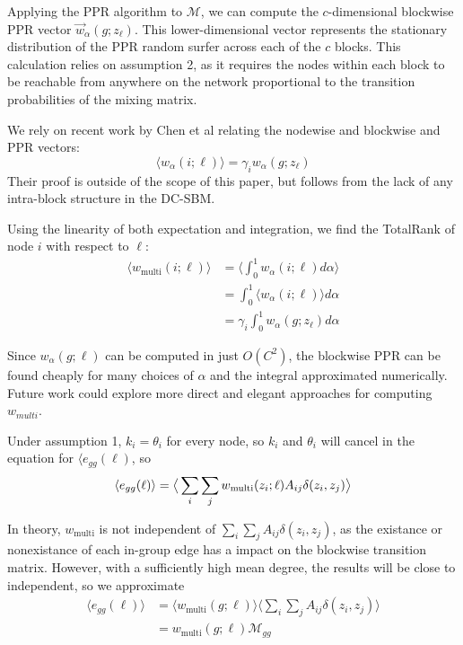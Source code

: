 \documentclass[12pt]{article}
\begin{document}
Applying the PPR algorithm to $\mathcal{M}$, we can compute the $c$-dimensional blockwise PPR vector $\vec{w}_\alpha(g; z_\ell)$.  This lower-dimensional vector represents the stationary distribution of the PPR random surfer across each of the $c$ blocks.  This calculation relies on assumption 2, as it requires the nodes within each block to be reachable from anywhere on the network proportional to the transition probabilities of the mixing matrix.

We rely on recent work by Chen et al \cite{chen:2020} relating the nodewise and blockwise and PPR vectors:
\begin{equation}
  \langle w_\alpha (i ; \ell) \rangle = \gamma_i w_\alpha(g; z_\ell)
\end{equation}
Their proof is outside of the scope of this paper, but follows from the lack of any intra-block structure in the DC-SBM.

Using the linearity of both expectation and integration, we find the TotalRank \cite{boldi:2005} \cite{Peel:2018} of node $i$ with respect to $\ell$:
\begin{equation}
  \begin{aligned}
    \langle w_\text{multi} (i ; \ell) \rangle &= \big \langle \int_0^1 w_\alpha(i; \ell) d\alpha \big \rangle \\
    &= \int_0^1 \langle w_\alpha(i; \ell) \rangle d\alpha \\
    &= \gamma_i \int_0^1 w_\alpha(g; z_\ell) d\alpha
  \end{aligned}
\end{equation}

Since $w_\alpha (g;\ell)$ can be computed in just $O(C^2)$, the blockwise PPR can be found cheaply for many choices of $\alpha$ and the integral approximated numerically.  Future work could explore more direct and elegant approaches for computing $w_{multi}$. 

Under assumption 1, $k_i = \theta_i$ for every node, so $k_i$ and $\theta_i$ will cancel in the equation for $\langle e_{gg} (\ell)$, so
\begin{equation}
    \langle e_{gg}(\ell) \rangle = \big \langle \sum_i \sum_j w_\text{multi}(z_i; \ell) A_{ij} \delta(z_i, z_j) \big \rangle\\
\end{equation}

In theory, $w_\text{multi}$ is not independent of $\sum_i \sum_j A_{ij} \delta(z_i, z_j)$, as the existance or nonexistance of each in-group edge has a impact on the blockwise transition matrix.  However, with a sufficiently high mean degree, the results will be close to independent, so we approximate
\begin{equation}
  \begin{aligned}
    \langle e_{gg}(\ell) \rangle &= \big \langle w_\text{multi}(g; \ell) \big \rangle \big \langle \sum_i \sum_j A_{ij} \delta(z_i, z_j) \big \rangle \\
    &= w_\text{multi}(g; \ell) \mathcal{M}_{gg}
  \end{aligned}
\end{equation}
\end{document}
